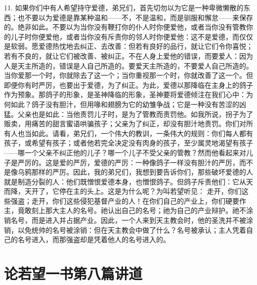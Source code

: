 11. 如果你们中有人希望持守爱德，弟兄们，首先切勿以为它是一种卑微懒散的东西；也不要以为爱德是靠某种温和——不，不是温和，而是驯服和懈怠——来保存的。绝非如此。不要以为当你没有鞭打你的仆人时你便爱他，或者当你没有管教你的儿子时你便爱他，或者当你没有斥责你的邻人时你便爱他：这不是爱德，而仅仅是软弱。愿爱德热忱地去纠正、去改善：但若有良好的品行，就让它们令你喜悦；若有不良的，就让它们被改善、被纠正。不在人身上爱他的错误，而要爱人：因为人是天主所造的，错误是人自己所造的。要爱天主所造的，不要爱人自己所造的。当你爱那一个时，你就除去了这一个；当你重视那一个时，你就改善了这一个。但即便你有时严厉，也要出于爱德，为了纠正。为此，爱德以那降临在主身上的鸽子作为预象。那鸽子的形象，是圣神降临的形象，圣神要将爱德倾注在我们心中：为何如此？鸽子没有胆汁，但用喙和翅膀为它的幼雏争战；它是一种没有苦涩的凶猛。父亲也是如此：当他责罚儿子时，是为了管教而责罚他。如我所说，拐子为了贩卖，用痛苦的甜言蜜语哄骗孩子；父亲为了纠正，却没有胆汁地责罚。你们对所有人也当如此。请看，弟兄们，一个伟大的教训，一条伟大的规则：你们每人都有孩子，或希望有孩子；或者他若完全决定没有肉身的孩子，至少属灵地渴望有孩子——哪一个父亲不纠正他的儿子？哪一个儿子不受父亲的管教？然而他看起来对儿子是严厉的。这是爱的严厉，爱德的严厉：一种像鸽子一样没有胆汁的严厉，而不是像乌鸦那样的严厉。因此，我的弟兄们，我想到要告诉你们，那些破坏爱德的人就是制造分裂的人：他们既憎恨爱德本身，也憎恨鸽子。但鸽子斥责他们：它从天而降，天开了，它停在主的头上。这是为什么呢？为叫若望听见：  走开，你们这些强盗；走开，你们这些侵犯基督产业的人！在你们自己的产业上，你们硬要作主，竟敢刻上那大主人的名号。祂认出自己的名号；祂为自己的产业辩护。祂不涂销名号，而是进入并占据产业。因此，一个人来到天主教会时，他的圣洗并不被涂销，以免统帅的名号被涂销：但在天主教会中做了什么？名号被承认；主人凭着自己的名号进入，而那强盗却是凭着他人的名号进入的。\par



\section{论若望一书第八篇讲道}


